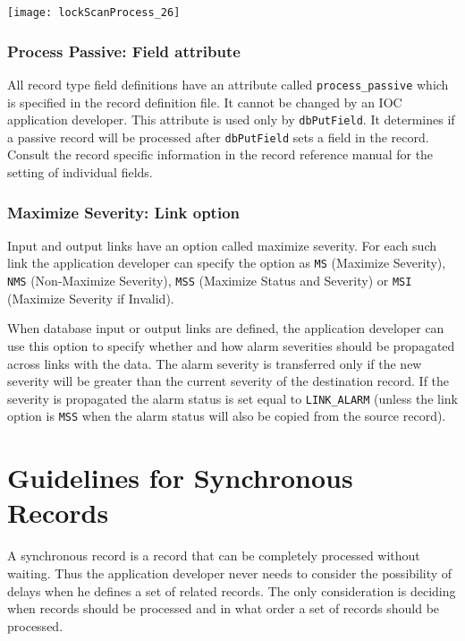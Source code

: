 \begin{center}
\texttt{[image: lockScanProcess\_26]}
\end{center}

\subsubsection{Process Passive: Field attribute}

All record type field definitions have an attribute called \verb|process_passive| which is specified in the record definition file.
It cannot be changed by an IOC application developer.
This attribute is used only by \verb|dbPutField|.
It determines if a passive record will be processed after \verb|dbPutField| sets a field in the record.
Consult the record specific information in the record reference manual for the setting of individual fields.

\subsubsection{Maximize Severity: Link option}

Input and output links have an option called maximize severity.
For each such link the application developer can specify the option as \verb|MS| (Maximize Severity), \verb|NMS| (Non-Maximize Severity), \verb|MSS| (Maximize Status and Severity) or \verb|MSI| (Maximize Severity if Invalid).

When database input or output links are defined, the application developer can use this option to specify whether and how alarm severities should be propagated across links with the data.
The alarm severity is transferred only if the new severity will be greater than the current severity of the destination record.
If the severity is propagated the alarm status is set equal to \verb|LINK_ALARM| (unless the link option is \verb|MSS| when the alarm status will also be copied from the source record).

\section{Guidelines for Synchronous Records}

A synchronous record is a record that can be completely processed without waiting.
Thus the application developer never needs to consider the possibility of delays when he defines a set of related records.
The only consideration is deciding when records should be processed and in what order a set of records should be processed.

